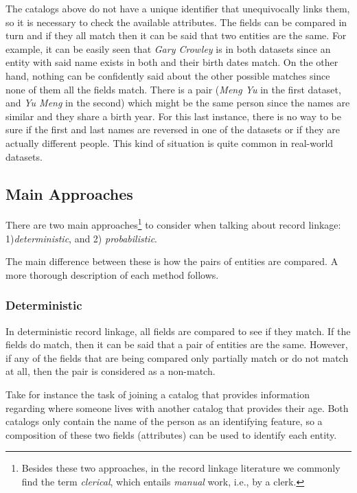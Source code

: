 \documentclass[epsfig,a4paper,11pt,titlepage,twoside,openany]{book}
\begin{document}
The catalogs above do not have a unique identifier that unequivocally links them, so it is necessary to check the available attributes. The fields can be compared in turn and if they all match then it can be said that two entities are the same. For example, it can be easily seen that \textit{Gary Crowley} is in both datasets since an entity with said name exists in both and their birth dates match. On the other hand, nothing can be confidently said about the other possible matches since none of them all the fields match. There is a pair (\textit{Meng Yu} in the first dataset, and \textit{Yu Meng} in the second) which might be the same person since the names are similar and they share a birth year. For this last instance, there is no way to be sure if the first and last names are reversed in one of the datasets or if they are actually different people. This kind of situation is quite common in real-world datasets.





\subsection{Main Approaches}
\label{sec:rl-main-approaches}

There are two main approaches\footnote{Besides these two approaches, in the record linkage literature we commonly find the term \textit{clerical}, which entails \textit{manual} work, i.e., by a clerk.} to consider when talking about record linkage: 1)\textit{deterministic}, and 2) \textit{probabilistic}. 

The main difference between these is how the pairs of entities are compared. A more thorough description of each method follows.


\subsubsection{Deterministic}
\label{sec:rl-approach-deterministic}

In deterministic record linkage, all fields are compared to see if they match. If the fields do match, then it can be said that a pair of entities are the same. However, if any of the fields that are being compared only partially match or do not match at all, then the pair is considered as a non-match. 

Take for instance the task of joining a catalog that provides information regarding where someone
lives with another catalog that provides their age. Both catalogs only contain the
name of the person as an identifying feature, so a composition of
these two fields (attributes) can be used to identify each entity.
\end{document}
